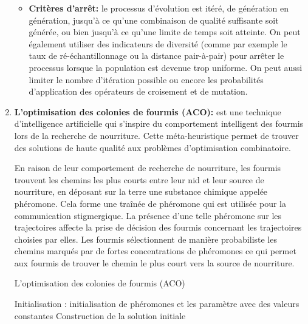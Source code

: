 \begin{enumerate}[label=\alph*)]
\begin{itemize}
	\item \textbf{Critères d’arrêt: } le processus d’évolution est itéré, de génération en génération, jusqu’à ce qu’une combinaison de qualité suffisante soit générée, ou bien jusqu’à ce qu’une limite de temps soit atteinte. On peut également utiliser des indicateurs de diversité (comme par exemple le taux de ré-échantillonnage ou la distance pair-à-pair) pour arrêter le processus lorsque la population est devenue trop uniforme. On peut aussi limiter le nombre d’itération possible ou encore les probabilités d’application des opérateurs de croisement et de 
mutation.
 
\end{itemize}	

	
	\item \textbf{L’optimisation des colonies de fourmis (ACO): }est une technique d’intelligence artificielle qui s'inspire du comportement intelligent des fourmis lors de la recherche de nourriture. Cette méta-heuristique permet de trouver des solutions de haute qualité aux problèmes d’optimisation combinatoire. 

En raison de leur comportement de recherche de nourriture, les fourmis trouvent les chemins les plus courts entre leur nid et leur source de nourriture, en déposant sur la terre une substance chimique appelée phéromone. Cela forme une traînée de phéromone qui est utilisée pour la communication stigmergique. La présence d'une telle phéromone sur les trajectoires affecte la prise de décision des fourmis concernant les trajectoires choisies par elles. Les fourmis sélectionnent de manière probabiliste les chemins marqués par de fortes concentrations de phéromones ce qui permet aux fourmis de trouver le chemin le plus court vers la source de nourriture.\\


\begin{algorithm}[H]
\caption{L’optimisation des colonies de fourmis (ACO)}
\SetAlgoLined
\DontPrintSemicolon

Initialisation : initialisation de phéromones et les paramètre avec des valeurs constantes \;
Construction de la solution initiale \;


\end{algorithm}
\end{enumerate}
